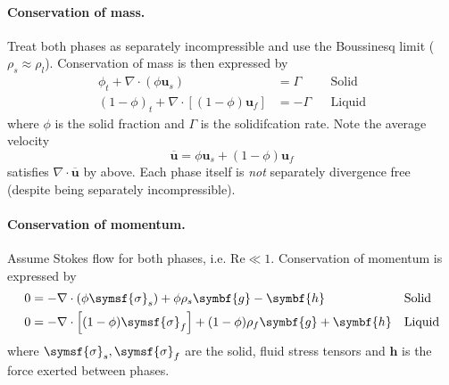 \documentclass{jknotes}
\renewcommand{\u}{\symbf{u}}
\begin{document}
\paragraph{Conservation of mass.} Treat both phases as separately
incompressible and use the Boussinesq limit ($\rho_s \approx \rho_l$).
Conservation of mass is then expressed by
\begin{align}
	\phi_t + \nabla \cdot (\phi \u_s) &= \Gamma &&\text{Solid}  \\
	(1-\phi)_t + \nabla \cdot \left[ (1-\phi)\u_f\right] &=
	-\Gamma &&\text{Liquid}
\end{align}
where $\phi$ is the solid fraction and $\Gamma$ is the solidifcation rate.
Note the average velocity
\begin{equation}
	\overline{\u} = \phi \u_s + (1-\phi)\u_f
\end{equation}
satisfies $\nabla \cdot \overline{\u}$ by above. Each phase itself is
\emph{not} separately divergence free (despite being separately
incompressible).

\paragraph{Conservation of momentum.} Assume Stokes flow for both phases, i.e.
$\text{Re} \ll 1$. Conservation of momentum is expressed by
\begin{align}
	0 &= -\nabla \cdot (\phi \symsf{\sigma}_s) + \phi \rho_s \symbf{g} -
	\symbf{h} &&\text{Solid} \\
	0 &= -\nabla \cdot \left[(1-\phi) \symsf{\sigma}_f\right] + (1-\phi)
	\rho_f \symbf{g} + \symbf{h} &&\text{Liquid}
\end{align}
where $\symsf{\sigma}_s, \symsf{\sigma}_f$ are the solid, fluid stress
tensors and $\symbf{h}$ is the force exerted between phases.
\end{document}
